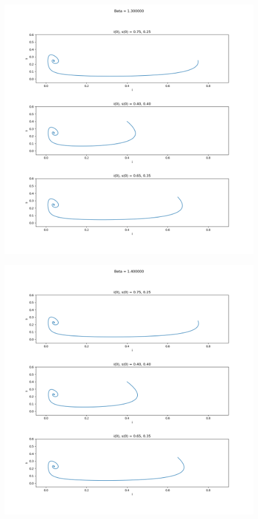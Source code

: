 \documentclass[11pt,a4paper]{CLabBookTemplate} %
\begin{document}
\begin{figure}[h!]
	\centering
	\includegraphics[width = 160mm]{Figures/Task1_4.png}
	\caption{}
	\label{fig:Task1_4}
\end{figure}

\begin{figure}[h!]
	\centering
	\includegraphics[width = 160mm]{Figures/Task1_5.png}
	\caption{}
	\label{fig:Task1_5}
\end{figure}
\end{document}
